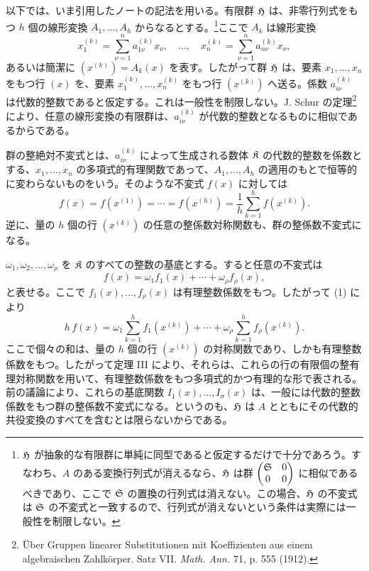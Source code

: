 以下では、いま引用したノートの記法を用いる。有限群 \(\mathfrak H\) は、非零行列式をもつ \(h\) 個の線形変換 \(A_1,\ldots,A_h\) からなるとする。\footnote{\(\mathfrak H\) が抽象的な有限群に単純に同型であると仮定するだけで十分であろう。すなわち、\(A\) のある変換行列式が消えるなら、\(\mathfrak H\) は群 \(\begin{pmatrix}\mathfrak S&0\\0&0\end{pmatrix}\) に相似であるべきであり、ここで \(\mathfrak S\) の置換の行列式は消えない。この場合、\(\mathfrak H\) の不変式は \(\mathfrak S\) の不変式と一致するので、行列式が消えないという条件は実際には一般性を制限しない。}ここで \(A_k\) は線形変換
\[
        x_1^{(k)}=\sum_{\nu=1}^{n}a_{1\nu}^{(k)}x_\nu,
        \quad\ldots,\quad
        x_n^{(k)}=\sum_{\nu=1}^{n}a_{n\nu}^{(k)}x_\nu,
\]
あるいは簡潔に \((x^{(k)})=A_k(x)\) を表す。したがって群 \(\mathfrak H\) は、要素 \(x_1,\ldots,x_n\) をもつ行 \((x)\) を、要素 \(x_1^{(k)},\ldots,x_n^{(k)}\) をもつ行 \((x^{(k)})\) へ送る。係数 \(a_{i\nu}^{(k)}\) は代数的整数であると仮定する。これは一般性を制限しない。J. Schur の定理\footnote{Über Gruppen linearer Substitutionen mit Koeffizienten aus einem algebraischen Zahlkörper. Satz VII. \emph{Math. Ann.} 71, p. 555 (1912).}により、任意の線形変換の有限群は、\(a_{i\nu}^{(k)}\) が代数的整数となるものに相似であるからである。

群の整絶対不変式とは、\(a_{i\nu}^{(k)}\) によって生成される数体 \(\mathfrak K\) の代数的整数を係数とする、\(x_1,\ldots,x_n\) の多項式的有理関数であって、\(A_1,\ldots,A_h\) の適用のもとで恒等的に変わらないものをいう。そのような不変式 \(f(x)\) に対しては
\begin{equation}
        f(x)=f(x^{(1)})=\cdots=f(x^{(h)})
        =\frac1h\sum_{k=1}^{h}f(x^{(k)}).
\end{equation}
逆に、量の \(h\) 個の行 \((x^{(k)})\) の任意の整係数対称関数も、群の整係数不変式になる。

\(\omega_1,\omega_2,\ldots,\omega_\rho\) を \(\mathfrak K\) のすべての整数の基底とする。すると任意の不変式は
\[
        f(x)=\omega_1 f_1(x)+\cdots+\omega_\rho f_\rho(x),
\]
と表せる。ここで \(f_1(x),\ldots,f_\rho(x)\) は有理整数係数をもつ。したがって (1) により
\[
        h\,f(x)
        =
        \omega_1\sum_{k=1}^{h}f_1(x^{(k)})
        +\cdots+
        \omega_\rho\sum_{k=1}^{h}f_\rho(x^{(k)}).
\]
ここで個々の和は、量の \(h\) 個の行 \((x^{(k)})\) の対称関数であり、しかも有理整数係数をもつ。したがって定理 III により、それらは、これらの行の有限個の整有理対称関数を用いて、有理整数係数をもつ多項式的かつ有理的な形で表される。前の議論により、これらの基底関数 \(I_1(x),\ldots,I_\sigma(x)\) は、一般には代数的整数係数をもつ群の整係数不変式になる。というのも、\(\mathfrak H\) は \(A\) とともにその代数的共役変換のすべてを含むとは限らないからである。

